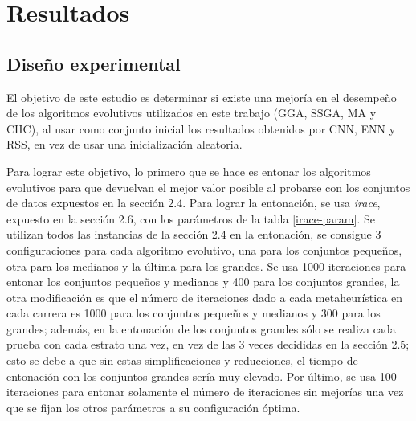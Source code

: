 \chapter{Resultados}
\label{capitulo3}

\section{Diseño experimental}

El objetivo de este estudio es determinar si existe una mejoría en el desempeño de los algoritmos evolutivos utilizados en este trabajo (GGA, SSGA, MA y CHC), al usar como conjunto inicial los resultados obtenidos por CNN, ENN y RSS, en vez de usar una inicialización aleatoria. 

Para lograr este objetivo, lo primero que se hace es entonar los algoritmos evolutivos para que devuelvan el mejor valor posible al probarse con los conjuntos de datos expuestos en la sección 2.4. Para lograr la entonación, se usa \emph{irace}, expuesto en la sección 2.6, con los parámetros de la tabla \ref{irace-param}. Se utilizan todos las instancias de la sección 2.4 en la entonación, se consigue 3 configuraciones para cada algoritmo evolutivo, una para los conjuntos pequeños, otra para los medianos y la última para los grandes. Se usa 1000 iteraciones para entonar los conjuntos pequeños y medianos y 400 para los conjuntos grandes, la otra modificación es que el número de iteraciones dado a cada metaheurística en cada carrera es 1000 para los conjuntos pequeños y medianos y 300 para los grandes; además, en la entonación de los conjuntos grandes sólo se realiza cada prueba con cada estrato una vez, en vez de las 3 veces decididas en la sección 2.5; esto se debe a que sin estas simplificaciones y reducciones, el tiempo de entonación con los conjuntos grandes sería muy elevado. Por último, se usa 100 iteraciones para entonar solamente el número de iteraciones sin mejorías una vez que se fijan los otros parámetros a su configuración óptima.

